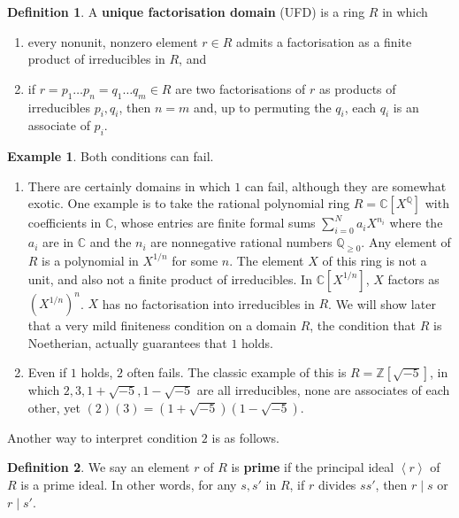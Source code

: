 \documentclass{article}
\newcommand{\Z}{\mathbb{Z}}
\newcommand{\Q}{\mathbb{Q}}
\newcommand{\C}{\mathbb{C}}
\newcommand{\rb}[1]{\left( #1 \right)}
\renewcommand{\sb}[1]{\left[ #1 \right]}
\newcommand{\ab}[1]{\left\langle #1 \right\rangle}
\theoremstyle{definition}\newtheorem{definition}{Definition}[subsection]
\theoremstyle{definition}\newtheorem{remark}[definition]{Remark}
\theoremstyle{definition}\newtheorem*{example}{Example}
\theoremstyle{definition}\newtheorem*{note}{Note}
\begin{document}
\begin{definition}
A \textbf{unique factorisation domain} (UFD) is a ring $ R $ in which
\begin{enumerate}
\item every nonunit, nonzero element $ r \in R $ admits a factorisation as a finite product of irreducibles in $ R $, and
\item if $ r = p_1 \dots p_n = q_1 \dots q_m \in R $ are two factorisations of $ r $ as products of irreducibles $ p_i, q_i $, then $ n = m $ and, up to permuting the $ q_i $, each $ q_i $ is an associate of $ p_i $.
\end{enumerate}
\end{definition}

\begin{example}
Both conditions can fail.
\begin{enumerate}
\item There are certainly domains in which $ 1 $ can fail, although they are somewhat exotic. One example is to take the rational polynomial ring $ R = \C\sb{X^\Q} $ with coefficients in $ \C $, whose entries are finite formal sums $ \sum_{i = 0}^N a_iX^{n_i} $ where the $ a_i $ are in $ \C $ and the $ n_i $ are nonnegative rational numbers $ \Q_{\ge 0} $. Any element of $ R $ is a polynomial in $ X^{1 / n} $ for some $ n $. The element $ X $ of this ring is not a unit, and also not a finite product of irreducibles. In $ \C\sb{X^{1 / n}} $, $ X $ factors as $ \rb{X^{1 / n}}^n $. $ X $ has no factorisation into irreducibles in $ R $. We will show later that a very mild finiteness condition on a domain $ R $, the condition that $ R $ is Noetherian, actually guarantees that $ 1 $ holds.
\item Even if $ 1 $ holds, $ 2 $ often fails. The classic example of this is $ R = \Z\sb{\sqrt{-5}} $, in which $ 2, 3, 1 + \sqrt{-5}, 1 - \sqrt{-5} $ are all irreducibles, none are associates of each other, yet $ \rb{2}\rb{3} = \rb{1 + \sqrt{-5}}\rb{1 - \sqrt{-5}} $.
\end{enumerate}
\end{example}

Another way to interpret condition $ 2 $ is as follows.

\begin{definition}
We say an element $ r $ of $ R $ is \textbf{prime} if the principal ideal $ \ab{r} $ of $ R $ is a prime ideal. In other words, for any $ s, s' $ in $ R $, if $ r $ divides $ ss' $, then $ r \mid s $ or $ r \mid s' $.
\end{definition}
\end{document}
